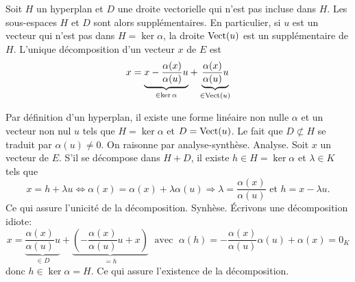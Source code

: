 \begin{propn}
 Soit $H$ un hyperplan et $D$ une droite vectorielle qui n'est pas incluse dans $H$. Les sous-espaces $H$ et $D$ sont alors supplémentaires.\newline
 En particulier, si $u$ est un vecteur qui n'est pas dans $H = \ker \alpha$, la droite $\mathop{\mathrm{Vect}}(u)$ est un supplémentaire de $H$. L'unique décomposition d'un vecteur $x$ de $E$ est
\begin{displaymath}
  x = \underset{\in \ker \alpha}{\underbrace{x-\frac{\alpha(x)}{\alpha(u)}u}}
  + \underset{\in \mathop{\mathrm{Vect}}(u)}{\underbrace{\frac{\alpha(x)}{\alpha(u)}u}}
\end{displaymath}
\end{propn}
\begin{demo}
Par définition d'un hyperplan, il existe une forme linéaire non nulle $\alpha$ et un vecteur non nul $u$ tels que $H=\ker \alpha$ et $D=\mathop{\mathrm{Vect}}(u)$. Le fait que $D\not\subset H$ se traduit par $\alpha(u)\neq 0$. On raisonne par analyse-synthèse.\newline
Analyse. Soit $x$ un vecteur de $E$. S'il se décompose dans $H + D$, il existe $h\in H =\ker \alpha$ et $\lambda \in K$ tels que 
\[
  x = h + \lambda u \Leftrightarrow \alpha(x) = \alpha(x) + \lambda\alpha(u) \Rightarrow \lambda = \frac{\alpha(x)}{\alpha(u)} \text{ et } h = x - \lambda u.
\]
Ce qui assure l'unicité de la décomposition.\newline
Synhèse. \'Ecrivons une décomposition idiote:
\begin{displaymath}
  x = \underset{\in D}{\underbrace{\frac{\alpha(x)}{\alpha(u)}u}} + \underset{= h}{\underbrace{\left(-\frac{\alpha(x)}{\alpha(u)}u + x \right)}}
\;\text{ avec }\;
\alpha(h) = -\frac{\alpha(x)}{\alpha(u)}\alpha(u) + \alpha(x) = 0_K
\end{displaymath}
donc $h\in \ker \alpha = H$. Ce qui assure l'existence de la décomposition.
\end{demo}

